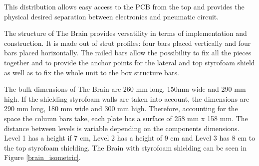 This distribution allows easy access to the PCB from the top and provides the physical desired separation between electronics and pneumatic circuit.


\smallskip
The structure of The Brain provides versatility in terms of implementation and construction. It is made out of strut profiles: four bars placed vertically and four bars placed horizontally. The railed bars allow the possibility to fix all the pieces together and to provide the anchor points for the lateral and top styrofoam shield as well as to fix the whole unit to the box structure bars. %





\smallskip
The bulk dimensions of The Brain are 260 mm long, 150mm wide and 290 mm high. If the shielding styrofoam walls are taken into account, the dimensions are 290 mm long, 180 mm wide and 300 mm high.
Therefore, accounting for the space the column bars take, each plate has a surface of 258 mm x 158 mm. The distance between levels is variable depending on the components dimensions. Level 1 has a height if 7 cm, Level 2 has a height of 9 cm and Level 3 has 8 cm to the top styrofoam shielding. The Brain with styrofoam shielding can be seen in Figure \ref{brain_isometric}.

